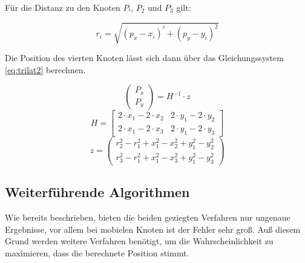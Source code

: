 Für die Distanz zu den Knoten $P_{¹}$, $P_{2}$ und $P_{3}$ gilt:

\begin{framed}
\begin{equation}
  \label{eq:trilat1}
  r_{i} = \sqrt{(p_{x} - x_{i})^{²} + (p_{y} - y_{i})^{2}}
\end{equation}
\end{framed}

Die Position des vierten Knoten lässt sich dann über das
Gleichungssystem \ref{eq:trilat2} berechnen.

\begin{framed}
\begin{equation}
  \label{eq:trilat2}
  \begin{pmatrix}
    P_{x} \\
    P_{y}
  \end{pmatrix}
  =
  H^{-1} \cdot z
\end{equation}
\begin{equation*}
  H = 
  \begin{bmatrix}
    2 \cdot x_{1} - 2 \cdot x_{2} & 2 \cdot y_{1} - 2 \cdot y_{2} \\
    2 \cdot x_{1} - 2 \cdot x_{3} & 2 \cdot y_{1} - 2 \cdot y_{3}
  \end{bmatrix}
\end{equation*}
\begin{equation*}
  z = 
  \begin{pmatrix}
    r_{2}^2 - r_{1}^2 + x_{1}^2 - x_{2}^2 + y_{1}^2 - y_{2}^2 \\
    r_{3}^2 - r_{1}^2 + x_{1}^2 - x_{3}^2 + y_{1}^2 - y_{3}^2
  \end{pmatrix}
\end{equation*}
\end{framed}


\subsection{Weiterführende Algorithmen}

Wie bereits beschrieben, bieten die beiden geziegten Verfahren nur
ungenaue Ergebnisse, vor allem bei mobielen Knoten ist der Fehler sehr
groß. Auß diesem Grund werden weitere Verfahren benötigt, um die
Wahrscheinlichkeit zu maximieren, dass die berechnete Position stimmt.

